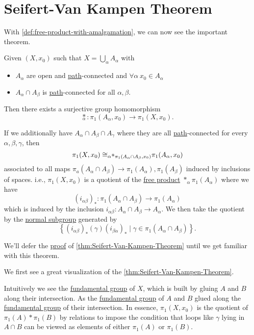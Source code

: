 \section{Seifert-Van Kampen Theorem}
With \autoref{def:free-product-with-amalgamation}, we can now see the important theorem.
\begin{theorem}\label{thm:Seifert-Van-Kampen-Theorem}
	Given \((X, x_0)\) such that \(X = \bigcup\limits_{\alpha } A_{\alpha }\) with
	\begin{itemize}
		\item \(A_{\alpha }\) are open and \hyperref[def:path]{path}-connected and \(\forall \alpha \ x_0\in A_{\alpha }\)
		\item \(A_{\alpha }\cap A_{\beta }\) is \hyperref[def:path]{path}-connected for all \(\alpha, \beta  \).
	\end{itemize}
	Then there exists a surjective group homomorphism
	\[
		\underset{\alpha }{\ast}\colon \pi _1(A_{\alpha }, x_0)\to \pi _1(X, x_0).
	\]

	\par If we additionally have \(A_{\alpha }\cap A_{\beta}\cap A_{\gamma}\) where they are all \hyperref[def:path]{path}-connected for every \(\alpha , \beta , \gamma\), then
	\[
		\pi _1(X, x_0)\cong _{\alpha }\hspace{-0.3em}\ast_{\pi _1(A_{\alpha }\cap A_{\beta }, x_0)}{}\pi _1(A_{\alpha }, x_0)
	\]
	associated to all maps \(\pi _a(A_{\alpha }\cap A_{\beta }) \to \pi _1 (A_{\alpha }), \pi _1(A_{\beta })\) induced by inclusions of spaces. i.e., \(\pi _1(X, x_0)\)
	is a quotient of the \hyperref[def:free-product-with-amalgamation]{free product} \(\ast_{\alpha}\pi _1(A_{\alpha })\) where we have
	\[
		(i_{\alpha \beta })_\ast\colon \pi _1(A_{\alpha }\cap A_{\beta })\to \pi _1(A_\alpha )
	\]
	which is induced by the inclusion \(i_{\alpha \beta }\colon A_{\alpha}\cap A_{\beta }\to A_{\alpha }\). We then take the quotient by the
	\hyperref[def:normal-subgroup]{normal subgroup} generated by
	\[
		\left\{(i_{\alpha \beta })_{\ast}(\gamma)(i_{\beta \alpha })_{\ast} \mid \gamma\in \pi _1(A_{\alpha }\cap A_{\beta })\right\}.
	\]
\end{theorem}
We'll defer the \hyperref[pf:thm:Seifert-Van-Kampen-Theorem]{proof} of \autoref{thm:Seifert-Van-Kampen-Theorem} until we get familiar with this theorem.
\begin{eg}
	We first see a great visualization of the \autoref{thm:Seifert-Van-Kampen-Theorem}.
	\begin{figure}[H]
		\centering
		\label{fig:eg:Seifert-Van-Kampen-Theorem}
	\end{figure}
	Intuitively we see the \hyperref[def:fundamental-group]{fundamental group} of \(X\), which is built by gluing \(A\) and \(B\) along their intersection.
	As the \hyperref[def:fundamental-group]{fundamental group} of \(A\) and \(B\) glued along the \hyperref[def:fundamental-group]{fundamental group} of their
	intersection. In essence, \(\pi _1 (X, x_0)\) is the quotient of \(\pi _1(A)\ast \pi _1(B)\) by relations to impose the condition that loops like \(\gamma \)
	lying in \(A\cap B\) can be viewed as elements of either \(\pi _1(A)\) or \(\pi _1(B)\).
\end{eg}

